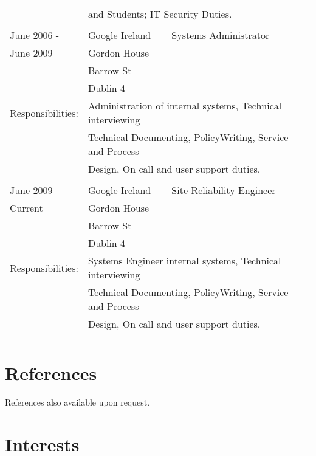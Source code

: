 \documentclass[a4paper, 11pt] {article}
\begin{document}
\begin{tabular}{llll}
						& \multicolumn{3}{l}{and Students; IT Security Duties.} 	\\
						& 									&	&	\\
June 2006 - 		&	Google Ireland	&	 Systems Administrator		&	\hspace{10mm}	\\
June 2009			&	Gordon House	&              &            			\\
      				&	Barrow St		&              &            			\\
      				&	Dublin 4			&              &            			\\
Responsibilities:	& \multicolumn{3}{l}{Administration of internal systems, Technical interviewing} 	\\
						& \multicolumn{3}{l}{Technical Documenting, PolicyWriting, Service and Process}		\\ 
						& \multicolumn{3}{l}{Design, On call and user support duties.} 	\\
      				&              						&  &	\\
June 2009 - 		&	Google Ireland	&	 Site Reliability Engineer	&	\hspace{10mm}	\\
Current  			&	Gordon House	&              &            			\\
      				&	Barrow St		&              &            			\\
      				&	Dublin 4			&              &            			\\
Responsibilities:	& \multicolumn{3}{l}{Systems Engineer  internal systems, Technical interviewing} 	\\
						& \multicolumn{3}{l}{Technical Documenting, PolicyWriting, Service and Process}		\\ 
						& \multicolumn{3}{l}{Design, On call and user support duties.} 	\\
      				&              						&  &	\\
\end{tabular}

\section*{References}

References also available upon request.

\section*{Interests}
\end{document}
